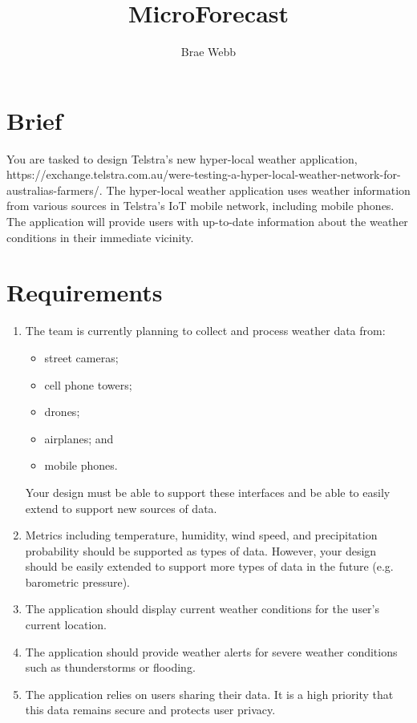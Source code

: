 \documentclass{csse4400}
\title{MicroForecast}
\author{Brae Webb}
\date{\week[tutorial]{3}}
\begin{document}
\maketitle

\section{Brief}

You are tasked to design Telstra's new hyper-local weather application, 
{https://exchange.telstra.com.au/were-testing-a-hyper-local-weather-network-for-australias-farmers/}.
The hyper-local weather application uses weather information from various sources in Telstra's IoT mobile network,
including mobile phones.
The application will provide users with up-to-date information about the weather conditions in their immediate vicinity.

\section{Requirements}

\begin{enumerate}
    \item The team is currently planning to collect and process weather data from:
        \begin{itemize}
            \item street cameras;
            \item cell phone towers;
            \item drones;
            \item airplanes; and
            \item mobile phones.
        \end{itemize}
        Your design must be able to support these interfaces and be able to easily extend to support new sources of data.
    \item Metrics including temperature, humidity, wind speed, and precipitation probability should be supported as types of data.
        However, your design should be easily extended to support more types of data in the future (e.g. barometric pressure).
    \item The application should display current weather conditions for the user's current location.
    \item The application should provide weather alerts for severe weather conditions such as thunderstorms or flooding.
    \item The application relies on users sharing their data. It is a high priority that this data remains secure and protects user privacy.
\end{enumerate}
\end{document}
